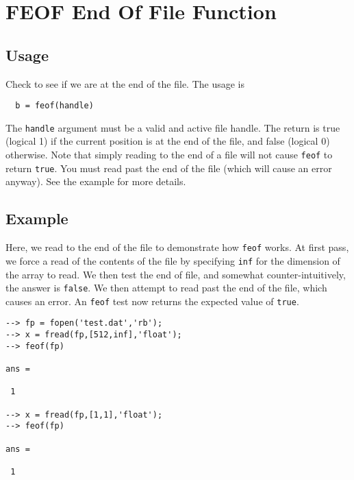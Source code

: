\section{FEOF End Of File Function}

\subsection{Usage}

Check to see if we are at the end of the file.  The usage is
\begin{verbatim}
  b = feof(handle)
\end{verbatim}
The \verb|handle| argument must be a valid and active file handle.  The
return is true (logical 1) if the current position is at the end of
the file, and false (logical 0) otherwise.  Note that simply reading
to the end of a file will not cause \verb|feof| to return \verb|true|.  
You must read past the end of the file (which will cause an error 
anyway).  See the example for more details.
\subsection{Example}

Here, we read to the end of the file to demonstrate how \verb|feof| works.
At first pass, we force a read of the contents of the file by specifying
\verb|inf| for the dimension of the array to read.  We then test the
end of file, and somewhat counter-intuitively, the answer is \verb|false|.
We then attempt to read past the end of the file, which causes an
error.  An \verb|feof| test now returns the expected value of \verb|true|.
\begin{verbatim}
--> fp = fopen('test.dat','rb');
--> x = fread(fp,[512,inf],'float');
--> feof(fp)

ans = 

 1 

--> x = fread(fp,[1,1],'float');
--> feof(fp)

ans = 

 1 
\end{verbatim}
